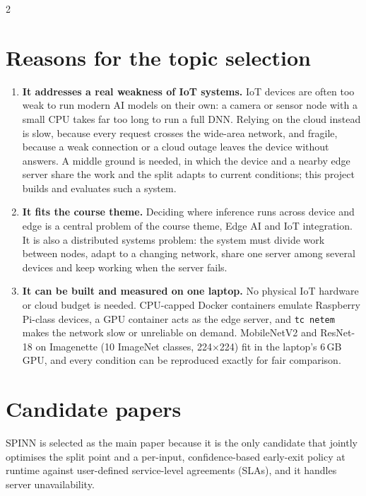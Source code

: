 \documentclass[10pt,a4paper]{article}
\begin{document}
\begin{multicols}{2}
\section{Reasons for the topic selection}
\begin{enumerate}
  \item \textbf{It addresses a real weakness of IoT systems.} IoT devices are often too weak to run modern AI models on their own: a camera or sensor node with a small CPU takes far too long to run a full DNN. Relying on the cloud instead is slow, because every request crosses the wide-area network, and fragile, because a weak connection or a cloud outage leaves the device without answers. A middle ground is needed, in which the device and a nearby edge server share the work and the split adapts to current conditions; this project builds and evaluates such a system.
  \item \textbf{It fits the course theme.} Deciding where inference runs across device and edge is a central problem of the course theme, Edge AI and IoT integration. It is also a distributed systems problem: the system must divide work between nodes, adapt to a changing network, share one server among several devices and keep working when the server fails.
  \item \textbf{It can be built and measured on one laptop.} No physical IoT hardware or cloud budget is needed. CPU-capped Docker containers emulate Raspberry Pi-class devices, a GPU container acts as the edge server, and \texttt{tc netem} makes the network slow or unreliable on demand. MobileNetV2 and ResNet-18 on Imagenette (10 ImageNet classes, 224$\times$224) fit in the laptop's 6\,GB GPU, and every condition can be reproduced exactly for fair comparison.
\end{enumerate}

\end{multicols}

\vspace{-4pt}
\section{Candidate papers}
SPINN is selected as the main paper because it is the only candidate that jointly optimises the split point and a per-input, confidence-based early-exit policy at runtime against user-defined service-level agreements (SLAs), and it handles server unavailability.
\end{document}

